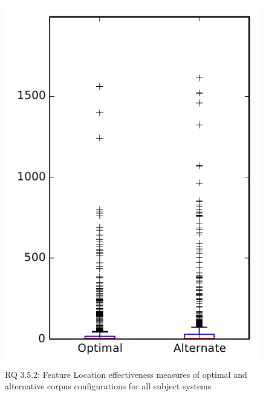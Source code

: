 
\begin{figure}
\centering
\includegraphics[height=0.4\textheight]{figures/combo/flt_rq2_overview}
\caption{RQ 3.5.2: Feature Location effectiveness measures of optimal and alternative corpus configurations for all subject systems}
\label{fig:combo:flt:rq2:overview}
\end{figure}
